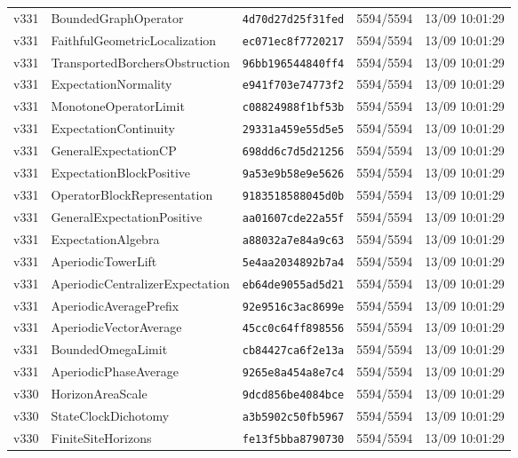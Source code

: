 \documentclass[11pt]{article}
\theoremstyle{definition}\newtheorem{deriv}{Derivation}
\begin{document}
{\begin{longtable}{@{}lllll@{}}
v331 & BoundedGraphOperator & \texttt{4d70d27d25f31fed} & 5594/5594 & 13/09 10:01:29 \\
v331 & FaithfulGeometricLocalization & \texttt{ec071ec8f7720217} & 5594/5594 & 13/09 10:01:29 \\
v331 & TransportedBorchersObstruction & \texttt{96bb196544840ff4} & 5594/5594 & 13/09 10:01:29 \\
v331 & ExpectationNormality & \texttt{e941f703e74773f2} & 5594/5594 & 13/09 10:01:29 \\
v331 & MonotoneOperatorLimit & \texttt{c08824988f1bf53b} & 5594/5594 & 13/09 10:01:29 \\
v331 & ExpectationContinuity & \texttt{29331a459e55d5e5} & 5594/5594 & 13/09 10:01:29 \\
v331 & GeneralExpectationCP & \texttt{698dd6c7d5d21256} & 5594/5594 & 13/09 10:01:29 \\
v331 & ExpectationBlockPositive & \texttt{9a53e9b58e9e5626} & 5594/5594 & 13/09 10:01:29 \\
v331 & OperatorBlockRepresentation & \texttt{9183518588045d0b} & 5594/5594 & 13/09 10:01:29 \\
v331 & GeneralExpectationPositive & \texttt{aa01607cde22a55f} & 5594/5594 & 13/09 10:01:29 \\
v331 & ExpectationAlgebra & \texttt{a88032a7e84a9c63} & 5594/5594 & 13/09 10:01:29 \\
v331 & AperiodicTowerLift & \texttt{5e4aa2034892b7a4} & 5594/5594 & 13/09 10:01:29 \\
v331 & AperiodicCentralizerExpectation & \texttt{eb64de9055ad5d21} & 5594/5594 & 13/09 10:01:29 \\
v331 & AperiodicAveragePrefix & \texttt{92e9516c3ac8699e} & 5594/5594 & 13/09 10:01:29 \\
v331 & AperiodicVectorAverage & \texttt{45cc0c64ff898556} & 5594/5594 & 13/09 10:01:29 \\
v331 & BoundedOmegaLimit & \texttt{cb84427ca6f2e13a} & 5594/5594 & 13/09 10:01:29 \\
v331 & AperiodicPhaseAverage & \texttt{9265e8a454a8e7c4} & 5594/5594 & 13/09 10:01:29 \\
v330 & HorizonAreaScale & \texttt{9dcd856be4084bce} & 5594/5594 & 13/09 10:01:29 \\
v330 & StateClockDichotomy & \texttt{a3b5902c50fb5967} & 5594/5594 & 13/09 10:01:29 \\
v330 & FiniteSiteHorizons & \texttt{fe13f5bba8790730} & 5594/5594 & 13/09 10:01:29 \\

\end{longtable}}
\end{document}
